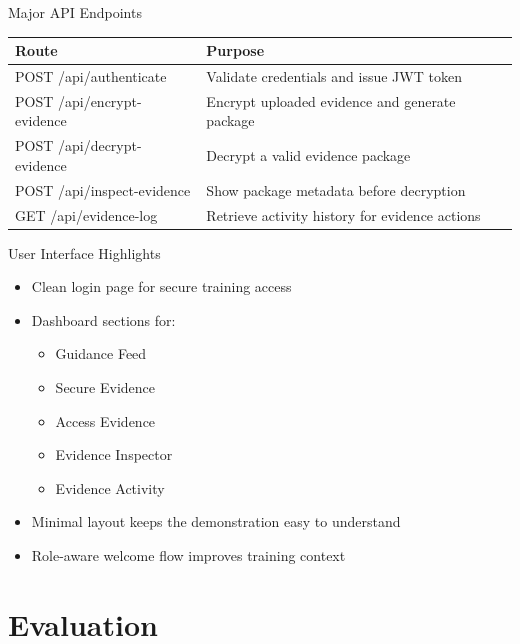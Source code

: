 \documentclass[aspectratio=169]{beamer}
\begin{document}
\begin{frame}{Major API Endpoints}
    \begin{table}
        \centering
        \begin{tabularx}{\textwidth}{>{\ttfamily}l X}
            \toprule
            Route & Purpose \\
            \midrule
            POST /api/authenticate & Validate credentials and issue JWT token \\
            POST /api/encrypt-evidence & Encrypt uploaded evidence and generate package \\
            POST /api/decrypt-evidence & Decrypt a valid evidence package \\
            POST /api/inspect-evidence & Show package metadata before decryption \\
            GET /api/evidence-log & Retrieve activity history for evidence actions \\
            \bottomrule
        \end{tabularx}
    \end{table}
\end{frame}

\begin{frame}{User Interface Highlights}
    \begin{itemize}
        \item Clean login page for secure training access
        \item Dashboard sections for:
        \begin{itemize}
            \item Guidance Feed
            \item Secure Evidence
            \item Access Evidence
            \item Evidence Inspector
            \item Evidence Activity
        \end{itemize}
        \item Minimal layout keeps the demonstration easy to understand
        \item Role-aware welcome flow improves training context
    \end{itemize}
\end{frame}

\section{Evaluation}
\end{document}
